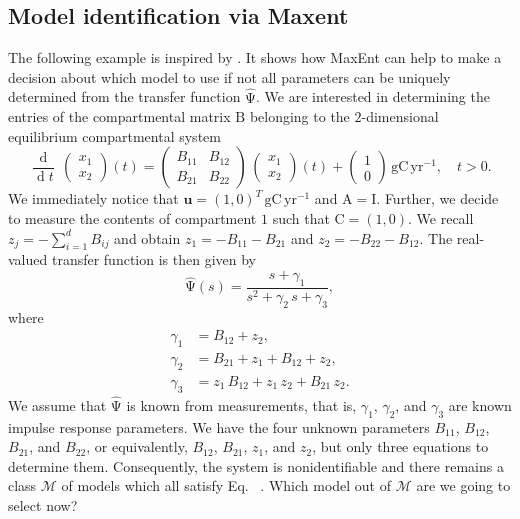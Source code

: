 \documentclass[smallextended]{svjour3}
\makeatletter
\renewcommand*{\eqref}[1]{%
  \hyperref[{#1}]{\textup{\tagform@{\ref*{#1}}}}%
}
\renewcommand{\tens}[1]{\mathrm{#1}}
\renewcommand{\vec}[1]{\mathbf{#1}}
\newcommand{\deriv}[1]{\frac{\operatorname{d}}{\operatorname{d}#1}}
\newcommand{\gC}{\mathrm{gC}}
\newcommand{\yr}{\mathrm{yr}}
\newcommand{\ie}{that is}
\makeatother
\begin{document}
\subsection{Model identification via Maxent}
  \label{sec:model_identification}
  The following example is inspired by \citet[Example~16\,C]{Anderson1983}.
  It shows how MaxEnt can help to make a decision about which model to use if not all parameters can be uniquely determined from the transfer function $\widehat{\tens{\Psi}}$.
	We are interested in determining the entries of the compartmental matrix $\tens{B}$ belonging to the $2$-dimensional equilibrium compartmental system
	\begin{equation}\label{eqn:opt_example}
        \deriv{t}\,
		\begin{pmatrix} x_1 \\ x_2 \end{pmatrix}(t)
		=
		\begin{pmatrix} B_{11} & B_{12} \\ B_{21} & B_{22} \end{pmatrix}\,
		\begin{pmatrix} x_1 \\ x_2 \end{pmatrix}(t)
		+
		\begin{pmatrix} 1 \\ 0 \end{pmatrix}\,\gC\,\yr^{-1},
		\quad t>0.
	\end{equation}
	We immediately notice that $\vec{u}=(1,0)^T\,\gC\,\yr^{-1}$ and $\tens{A}=\tens{I}$.
	Further, we decide to measure the contents of compartment $1$ such that $\tens{C} = (1,0)$.
	We recall $z_j = -\sum_{i=1}^d B_{ij}$ and obtain $z_1 = -B_{11} - B_{21}$ and $z_2 = - B_{22} - B_{12}$.
	The real-valued transfer function is then given by
	\begin{equation}
		\widehat{\tens{\Psi}}(s) = \frac{s + \gamma_1}{s^2+\gamma_2\,s+\gamma_3},
	\end{equation}
	where
	\begin{equation}\label{eqn:measurement_data}
		\begin{aligned}
			\gamma_1 &= B_{12} + z_2,\\
			\gamma_2 &= B_{21} + z_1 + B_{12} + z_2,\\
			\gamma_3 &= z_1\,B_{12} + z_1\,z_2 + B_{21}\,z_2.
		\end{aligned}
	\end{equation}
	We assume that $\widehat{\tens{\Psi}}$ is known from measurements, \ie, $\gamma_1$, $\gamma_2$, and $\gamma_3$ are known impulse response parameters.	
	We have the four unknown parameters $B_{11}$, $B_{12}$, $B_{21}$, and $B_{22}$, or equivalently, $B_{12}$, $B_{21}$, $z_1$, and $z_2$, but only three equations to determine them.
	Consequently, the system is nonidentifiable and there remains a class $\mathcal{M}$ of models which all satisfy Eq.~\eqref{eqn:measurement_data}.
	Which model out of $\mathcal{M}$ are we going to select now?
\end{document}
